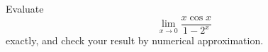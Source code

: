 Evaluate
\begin{equation*}
  \lim_{x\rightarrow 0} \frac{x\cos x}{1-2^x}
\end{equation*}
exactly, and check your result by numerical approximation.

